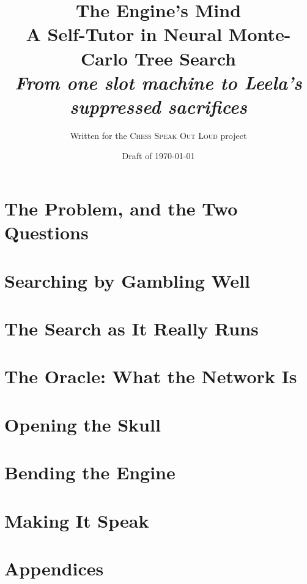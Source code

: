 \documentclass[11pt,a4paper,twoside,openright]{book}
\title{\vspace{-2cm}\Huge\bfseries The Engine's Mind\\[0.6em]
  \Large\normalfont A Self-Tutor in Neural Monte-Carlo Tree Search\\[0.3em]
  \large\itshape From one slot machine to Leela's suppressed sacrifices}
\author{Written for the \textsc{Chess Speak Out Loud} project}
\date{Draft of \today}
\begin{document}
\frontmatter
\maketitle



\tableofcontents

\mainmatter

\part{The Problem, and the Two Questions}



\part{Searching by Gambling Well}






\part{The Search as It Really Runs}



\part{The Oracle: What the Network Is}




\part{Opening the Skull}




\part{Bending the Engine}



\part{Making It Speak}



\appendix
\part*{Appendices}






\end{document}
